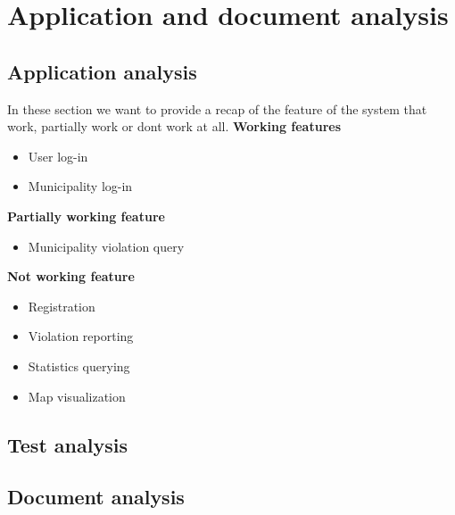 \documentclass[../ATD.tex]{subfiles}
\begin{document}
    \chapter{Application and document analysis}\label{ch:application-and-document-analysis}
    \section{Application analysis}\label{sec:application-analysis}
    In these section we want to provide a recap of the feature of the system that work, partially work or dont work at all.
    \newline
    \textbf{Working features}
    \begin{itemize}
        \item User log-in
        \item Municipality log-in
    \end{itemize}
    \newline
    \textbf{Partially working feature}
    \begin{itemize}
        \item Municipality violation query
    \end{itemize}
    \newline
    \textbf{Not working feature}
    \begin{itemize}
        \item Registration
        \item Violation reporting
        \item Statistics querying
        \item Map visualization
    \end{itemize}

    \section{Test analysis}\label{sec:test-analysis}


    \section{Document analysis}\label{sec:document-analysis}

\end{document}
